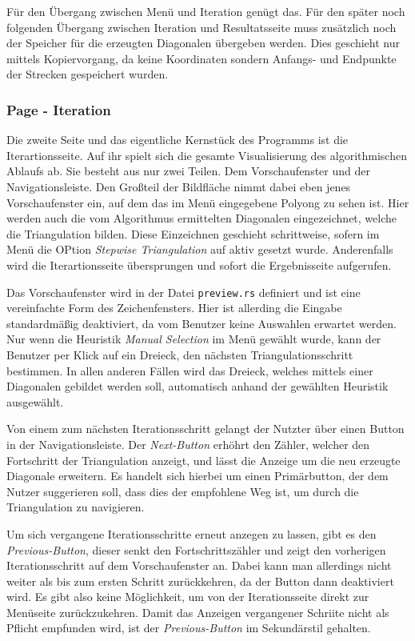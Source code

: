 Für den Übergang zwischen Menü und Iteration genügt das. Für den später noch folgenden Übergang zwischen Iteration und Resultatsseite muss zusätzlich noch der Speicher für die erzeugten Diagonalen übergeben werden.
Dies geschieht nur mittels Kopiervorgang, da keine Koordinaten sondern Anfangs- und Endpunkte der Strecken gespeichert wurden.

\subsubsection{Page - Iteration}

Die zweite Seite und das eigentliche Kernstück des Programms ist die Iterartionsseite. Auf ihr spielt sich die gesamte Visualisierung des algorithmischen Ablaufs ab.
Sie besteht aus nur zwei Teilen. Dem Vorschaufenster und der Navigationsleiste. Den Großteil der Bildfläche nimmt dabei eben jenes Vorschaufenster ein, auf dem das im Menü eingegebene 
Polyong zu sehen ist. Hier werden auch die vom Algorithmus ermittelten Diagonalen eingezeichnet, welche die Triangulation bilden. Diese Einzeichnen geschieht schrittweise, sofern 
im Menü die OPtion \emph{Stepwise Triangulation} auf aktiv gesetzt wurde. Anderenfalls wird die Iterartionsseite übersprungen und sofort die Ergebnisseite aufgerufen.

Das Vorschaufenster wird in der Datei \lstinline{preview.rs} definiert und ist eine vereinfachte Form des Zeichenfensters. Hier ist allerding die Eingabe standardmäßig deaktiviert, da vom Benutzer keine 
Auswahlen erwartet werden. Nur wenn die Heuristik \emph{Manual Selection} im Menü gewählt wurde, kann der Benutzer per Klick auf ein Dreieck, den nächsten Triangulationsschritt bestimmen.
In allen anderen Fällen wird das Dreieck, welches mittels einer Diagonalen gebildet werden soll, automatisch anhand der gewählten Heuristik ausgewählt.

Von einem zum nächsten Iterationsschritt gelangt der Nutzter über einen Button in der Navigationsleiste. Der \emph{Next-Button} erhöhrt den Zähler, welcher den Fortschritt der Triangulation anzeigt, 
und lässt die Anzeige um die neu erzeugte Diagonale erweitern. Es handelt sich hierbei um einen Primärbutton, der dem Nutzer suggerieren soll, dass dies der empfohlene Weg ist, um durch die Triangulation zu navigieren.

Um sich vergangene Iterationsschritte erneut anzegen zu lassen, gibt es den \emph{Previous-Button}, dieser senkt den Fortschrittszähler und zeigt den vorherigen Iterationsschritt auf dem Vorschaufenster an.
Dabei kann man allerdings nicht weiter als bis zum ersten Schritt zurückkehren, da der Button dann deaktiviert wird. Es gibt also keine Möglichkeit, um von der Iterationsseite direkt zur Menüseite zurückzukehren.
Damit das Anzeigen vergangener Schriite nicht als Pflicht empfunden wird, ist der \emph{Previous-Button} im Sekundärstil gehalten.

